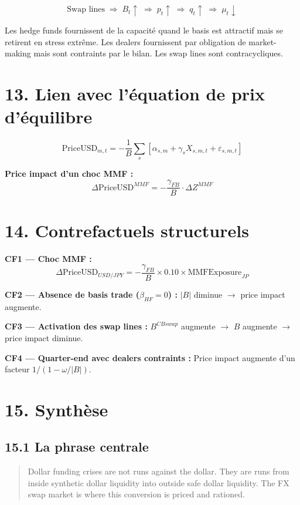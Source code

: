 \begin{proposition}
\[
\text{Swap lines} \;\Rightarrow\; B_t \uparrow \;\Rightarrow\; p_t \uparrow \;\Rightarrow\; q_t \uparrow \;\Rightarrow\; \mu_t \downarrow
\]
\end{proposition}

\begin{proposition}
Les hedge funds fournissent de la capacité quand le basis est attractif mais se retirent en stress extrême. Les dealers fournissent par obligation de market-making mais sont contraints par le bilan. Les swap lines sont contracycliques.
\end{proposition}

\section*{13. Lien avec l'équation de prix d'équilibre}

\begin{equation}
\text{PriceUSD}_{m,t} = -\frac{1}{B} \sum_s \left[ \alpha_{s,m} + \gamma_s X_{s,m,t} + \varepsilon_{s,m,t} \right]
\label{eq:price-eq}
\end{equation}

\textbf{Price impact d'un choc MMF :}
\[
\Delta\text{PriceUSD}^{MMF} = -\frac{\gamma_{FB}}{B} \cdot \Delta Z^{MMF}
\]

\section*{14. Contrefactuels structurels}

\textbf{CF1 — Choc MMF :}
\[
\Delta\text{PriceUSD}_{USD/JPY} = -\frac{\gamma_{FB}}{B} \times 0.10 \times \text{MMFExposure}_{JP}
\]

\textbf{CF2 — Absence de basis trade ($\beta_{HF} = 0$) :}
$|B|$ diminue $\to$ price impact augmente.

\textbf{CF3 — Activation des swap lines :}
$B^{CBswap}$ augmente $\to$ $B$ augmente $\to$ price impact diminue.

\textbf{CF4 — Quarter-end avec dealers contraints :}
Price impact augmente d'un facteur $1/(1 - \omega/|B|)$.

\section*{15. Synthèse}

\subsection*{15.1 La phrase centrale}

\begin{quote}
Dollar funding crises are not runs against the dollar.
They are runs from inside synthetic dollar liquidity into
outside safe dollar liquidity. The FX swap market is where
this conversion is priced and rationed.
\end{quote}

